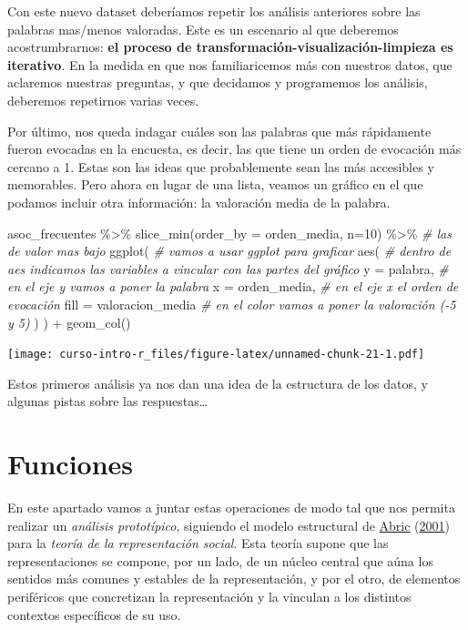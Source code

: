 \documentclass[
]{book}
\newenvironment{Shaded}{\begin{snugshade}}{\end{snugshade}}
\newcommand{\AttributeTok}[1]{\textcolor[rgb]{0.77,0.63,0.00}{#1}}
\newcommand{\CommentTok}[1]{\textcolor[rgb]{0.56,0.35,0.01}{\textit{#1}}}
\newcommand{\DecValTok}[1]{\textcolor[rgb]{0.00,0.00,0.81}{#1}}
\newcommand{\FunctionTok}[1]{\textcolor[rgb]{0.00,0.00,0.00}{#1}}
\newcommand{\NormalTok}[1]{#1}
\newcommand{\SpecialCharTok}[1]{\textcolor[rgb]{0.00,0.00,0.00}{#1}}
\begin{document}
Con este nuevo dataset deberíamos repetir los análisis anteriores sobre las palabras mas/menos valoradas. Este es un escenario al que deberemos acostrumbrarnos: \textbf{el proceso de transformación-visualización-limpieza es iterativo}. En la medida en que nos familiaricemos más con nuestros datos, que aclaremos nuestras preguntas, y que decidamos y programemos los análisis, deberemos repetirnos varias veces.

Por último, nos queda indagar cuáles son las palabras que más rápidamente fueron evocadas en la encuesta, es decir, las que tiene un orden de evocación más cercano a 1. Estas son las ideas que probablemente sean las más accesibles y memorables. Pero ahora en lugar de una lista, veamos un gráfico en el que podamos incluir otra información: la valoración media de la palabra.

\begin{Shaded}
\begin{Highlighting}[]
\NormalTok{asoc\_frecuentes }\SpecialCharTok{\%\textgreater{}\%} 
    \FunctionTok{slice\_min}\NormalTok{(}\AttributeTok{order\_by =}\NormalTok{ orden\_media, }\AttributeTok{n=}\DecValTok{10}\NormalTok{) }\SpecialCharTok{\%\textgreater{}\%} \CommentTok{\# las de valor mas bajo}
  \FunctionTok{ggplot}\NormalTok{( }\CommentTok{\# vamos a usar ggplot para graficar}
    \FunctionTok{aes}\NormalTok{( }\CommentTok{\# dentro de aes indicamos las variables a vincular con las partes del gráfico}
      \AttributeTok{y =}\NormalTok{ palabra, }\CommentTok{\# en el eje y vamos a poner la palabra}
      \AttributeTok{x =}\NormalTok{ orden\_media, }\CommentTok{\# en el eje x el orden de evocación}
      \AttributeTok{fill =}\NormalTok{ valoracion\_media }\CommentTok{\# en el color vamos a poner la valoración ({-}5 y 5)}
\NormalTok{    )}
\NormalTok{  ) }\SpecialCharTok{+} 
  \FunctionTok{geom\_col}\NormalTok{()}
\end{Highlighting}
\end{Shaded}

\texttt{[image: curso-intro-r\_files/figure-latex/unnamed-chunk-21-1.pdf]}

Estos primeros análisis ya nos dan una idea de la estructura de los datos, y algunas pistas sobre las respuestas\ldots{}

\hypertarget{funciones}{%
\section{Funciones}\label{funciones}}

En este apartado vamos a juntar estas operaciones de modo tal que nos permita realizar un \emph{análisis prototípico}, siguiendo el modelo estructural de \protect\hyperlink{ref-Abric2001}{Abric} (\protect\hyperlink{ref-Abric2001}{2001}) para la \emph{teoría de la representación social}. Esta teoría supone que las representaciones se compone, por un lado, de un núcleo central que aúna los sentidos más comunes y estables de la representación, y por el otro, de elementos periféricos que concretizan la representación y la vinculan a los distintos contextos específicos de su uso.
\end{document}
